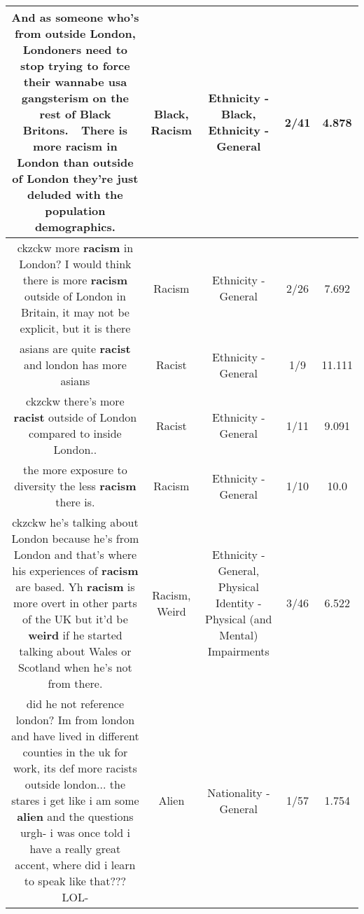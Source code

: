 \documentclass[11pt]{article}
\newlength\mylength
\begin{document}
\begin{center}
\begin{longtable}{|C{.65\mylength}|C{.30\mylength}|C{.12\mylength}|C{.12\mylength}|C{.12\mylength}|}
  \small And as someone who's from outside London, Londoners need to stop trying to force their wannabe usa gangsterism on the rest of \textbf{Black} Britons.  There is more \textbf{racism} in London than outside of London they're just deluded with the population demographics.\normalsize   & Black, Racism & Ethnicity - Black, Ethnicity - General & 2/41 & 4.878 \\  \hline
  \small ckzckw more \textbf{racism} in London? I would think there is more \textbf{racism} outside of London in Britain, it may not be explicit, but it is there\normalsize   & Racism & Ethnicity - General & 2/26 & 7.692 \\  \hline
  \small asians are quite \textbf{racist} and london has more asians\normalsize   & Racist & Ethnicity - General & 1/9 & 11.111 \\  \hline
  \small ckzckw there's more \textbf{racist} outside of London compared to inside London..\normalsize   & Racist & Ethnicity - General & 1/11 & 9.091 \\  \hline
  \small the more exposure to diversity the less \textbf{racism} there is.\normalsize   & Racism & Ethnicity - General & 1/10 & 10.0 \\  \hline
  \small ckzckw he's talking about London because he's from London and that's where his experiences of \textbf{racism} are based. Yh \textbf{racism} is more overt in other parts of the UK but it'd be \textbf{weird} if he started talking about Wales or Scotland when he's not from there.\normalsize   & Racism, Weird & Ethnicity - General, Physical Identity - Physical (and Mental) Impairments & 3/46 & 6.522 \\  \hline
  \small did he not reference london? Im from london and have lived in different counties in the uk for work, its def more racists outside london... the stares i get like i am some \textbf{alien} and the questions urgh- i was once told i have a really great accent, where did i learn to speak like that??? LOL-\normalsize   & Alien & Nationality - General & 1/57 & 1.754 \\  \hline

\end{longtable}
\end{center}
\end{document}
